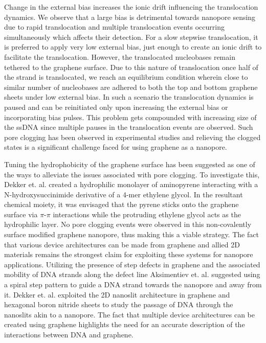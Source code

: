Change in the external bias increases the ionic drift influencing the  translocation dynamics.  We observe that a large bias is detrimental towards nanopore sensing due to rapid translocation and multiple translocation events occurring simultaneously which affects their detection. For a slow stepwise translocation, it is preferred to apply very low external bias, just enough to create an ionic drift to facilitate the translocation. However, the translocated nucleobases remain tethered to the graphene surface. Due to this nature of translocation once half of the strand is translocated, we reach an equilibrium condition wherein close to similar number of nucleobases are adhered to both the top and bottom graphene sheets under low external bias. In such a scenario the translocation dynamics is paused and can be reinitiated only upon increasing the external bias or incorporating bias pulses. This problem gets compounded with increasing size of the ssDNA since multiple pauses in the translocation events are observed. Such pore clogging has been observed in experimental studies and relieving the clogged states is a significant challenge faced for using graphene as a nanopore.\supercite{garaj_graphene_2010,merchant_dna_2010, schneider_dna_2010, schneider_tailoring_2013}

Tuning the hydrophobicity of the graphene surface has been suggested as one of the ways to alleviate the issues associated with pore clogging. To investigate this, Dekker et. al. created a hydrophilic monolayer of aminopyrene interacting with a N-hydroxysuccinimide derivative of a 4-mer ethylene glycol.\supercite{schneider_tailoring_2013} In the resultant chemical moiety, it was envisaged that the pyrene sticks onto the graphene surface via $\pi$-$\pi$ interactions while the protruding ethylene glycol acts as the hydrophilic layer. No pore clogging events were observed in this non-covalently surface modified graphene nanopore, thus making this a viable strategy. The fact that various device architectures can be made from graphene and allied 2D materials remains the strongest claim for exploiting these systems for nanopore applications. Utilizing the presence of step defects in graphene and the associated mobility of DNA strands along the defect line Aksimentiev et. al. suggested using a spiral step pattern to guide a DNA strand towards the nanopore and away from it.\supercite{shankla_step-defect_2019} Dekker et. al. exploited the 2D nanoslit architecture in graphene and hexagonal boron nitride sheets to study the passage of DNA through the nanoslits akin to a nanopore.\supercite{yang_translocation_2021} The fact that multiple device architectures can be created using graphene highlights the need for an accurate description of the interactions between DNA and graphene. 

